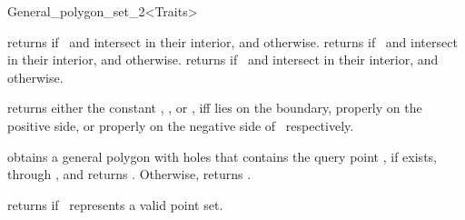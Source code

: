 \begin{ccRefClass}{General_polygon_set_2<Traits>}
\ccQueryFunctions

\ccThreeToTwo

  {returns  if \ccVar\ and  intersect in their
  interior, and  otherwise.}
\ccGlue
{}
  {returns  if \ccVar\ and  intersect in their
  interior, and  otherwise.}
\ccGlue
{}
  {returns  if \ccVar\ and  intersect in their
  interior, and  otherwise.}
  
  {returns either the constant , 
   , or , iff  lies on 
   the boundary, properly on the positive side, or properly on the negative 
   side of \ccVar\ respectively.}

  {obtains a general polygon with holes that contains the query point
  , if exists, through , and returns
  . Otherwise, returns .}


  {returns  if \ccVar\ represents a valid point set.}

\ccSeeAlso
  \\
  \\

\end{ccRefClass}

\ccRefPageEnd
